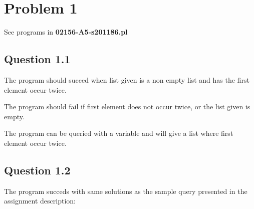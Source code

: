 \newpage
\section*{Problem 1}
See programs in \textbf{02156-A5-s201186.pl}

\subsection*{Question 1.1}
The program should succed when list given is a non empty list and has the first element occur twice.

The program should fail if first element does not occur twice, or the list given is empty.


The program can be queried with a variable and will give a list where first element occur twice.


\newpage
\subsection*{Question 1.2}
The program succeds with same solutions as the sample query presented in the assignment description:

